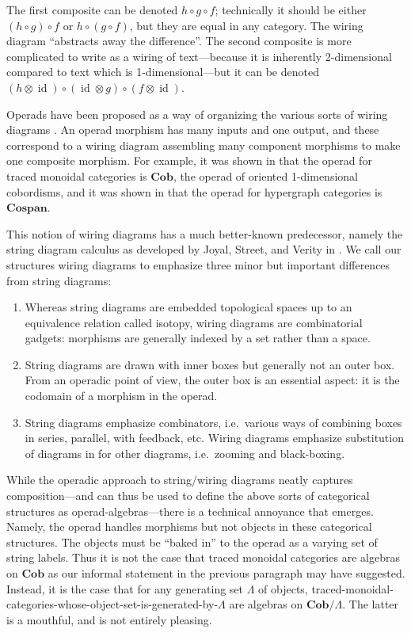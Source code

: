 \documentclass[11pt, article, oneside]{memoir}
\theoremstyle{plain}
\theoremstyle{definition}
\theoremstyle{remark}
\newcommand{\Cat}[1]{\mathbf{#1}}
\DeclareMathOperator{\id}{id}
\newcommand{\Cospan}{\Cat{Cospan}}
\newcommand{\Cob}{\Cat{Cob}}
\begin{document}
The first composite can be denoted $h\circ g\circ f$; technically it should be either $(h\circ g)\circ f$ or $h\circ (g\circ f)$, but they are equal in any category. The wiring diagram ``abstracts away the difference''. The second composite is more complicated to write as a wiring of text---because it is inherently 2-dimensional compared to text which is 1-dimensional---but it can be denoted $(h\otimes\id)\circ(\id\otimes g)\circ(f\otimes\id)$.

Operads have been proposed as a way of organizing the various sorts of wiring diagrams \cite{Spivak:2013b,Rupel.Spivak:2013a}. An operad morphism has many inputs and one output, and these correspond to a wiring diagram assembling many component morphisms to make one composite morphism. For example, it was shown in \cite{Spivak.Schultz.Rupel:2016a} that the operad for traced monoidal categories is $\Cob$, the operad of oriented 1-dimensional cobordisms, and it was shown in \cite[Section 4.4.2]{Fong:2016a} that the operad for hypergraph categories is $\Cospan$.

This notion of wiring diagrams has a much better-known predecessor, namely the string diagram calculus as developed by Joyal, Street, and Verity in \cite{Joyal.Street:1993a, Joyal.Street.Verity:1996a}. We call our structures wiring diagrams to emphasize three minor but important differences from string diagrams:
\begin{enumerate}
	\item Whereas string diagrams are embedded topological spaces up to an equivalence relation called isotopy, wiring diagrams are combinatorial gadgets: morphisms are generally indexed by a set rather than a space.
	\item String diagrams are drawn with inner boxes but generally not an outer box. From an operadic point of view, the outer box is an essential aspect: it is the codomain of a morphism in the operad.
	\item String diagrams emphasize combinators, i.e.\ various ways of combining boxes in series, parallel, with feedback, etc. Wiring diagrams emphasize substitution of diagrams in for other diagrams, i.e.\ zooming and black-boxing.
\end{enumerate}

While the operadic approach to string/wiring diagrams neatly captures composition---and can thus be used to define the above sorts of categorical structures as operad-algebras---there is a technical annoyance that emerges. Namely, the operad handles morphisms but not objects in these categorical structures. The objects must be ``baked in'' to the operad as a varying set of string labels. Thus it is not the case that traced monoidal categories are algebras on $\Cob$ as our informal statement in the previous paragraph may have suggested. Instead, it is the case that for any generating set $\Lambda$ of objects, traced-monoidal-categories-whose-object-set-is-generated-by-$\Lambda$ are algebras on $\Cob/\Lambda$. The latter is a mouthful, and is not entirely pleasing.
\end{document}
